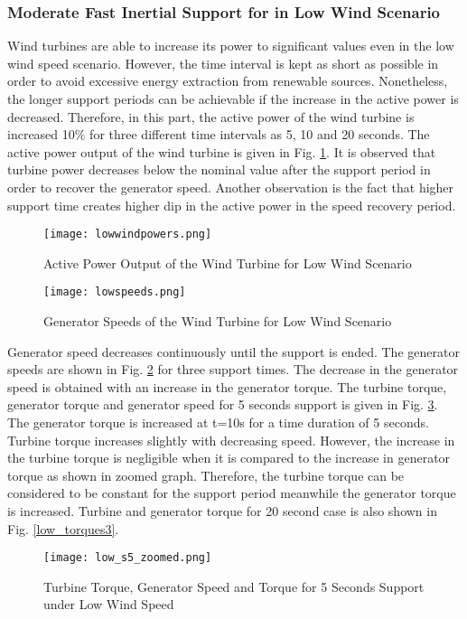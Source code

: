 \subsubsection{Moderate Fast Inertial Support for in Low Wind Scenario}
Wind turbines are able to increase its power to significant values even in the low wind speed scenario. However, the time interval is kept as short as possible in order to avoid excessive energy extraction from renewable sources. Nonetheless, the longer support periods can be achievable if the increase in the active power is decreased. Therefore, in this part, the active power of the wind turbine is increased 10\% for three different time intervals as 5, 10 and 20 seconds. The active power output of the wind turbine is given in Fig. \ref{lowactivepowers}. It is observed that turbine power decreases below the nominal value after the support period in order to recover the generator speed. Another observation is the fact that higher support time creates higher dip in the active power in the speed recovery period.\par
\begin{figure}[h]
	\centering
	\texttt{[image: lowwindpowers.png]}
	\caption{Active Power Output of the Wind Turbine for Low Wind Scenario}
	\label{lowactivepowers}
\end{figure}
\begin{figure}[h]
	\centering
	\texttt{[image: lowspeeds.png]}
	\caption{Generator Speeds of the Wind Turbine for Low Wind Scenario}
	\label{low_speeds}
\end{figure}
Generator speed decreases continuously until the support is ended. The generator speeds are shown in Fig. \ref{low_speeds} for three support times. The decrease in the generator speed is obtained with an increase in the generator torque. The turbine torque, generator torque and generator speed for 5 seconds support is given in Fig. \ref{low_torques}. The generator torque is increased at t=10s for a time duration of 5 seconds. Turbine torque increases slightly with decreasing speed. However, the increase in the turbine torque is negligible when it is compared to the increase in generator torque as shown in zoomed graph. Therefore, the turbine torque can be considered to be constant for the support period meanwhile the generator torque is increased. Turbine and generator torque for 20 second case is also shown in Fig. \ref{low_torques3}.\par
\begin{figure}[h!]
	\centering
	\texttt{[image: low\_s5\_zoomed.png]}
	\caption{Turbine Torque, Generator Speed and Torque for 5 Seconds Support under Low Wind Speed}
	\label{low_torques}
\end{figure}

